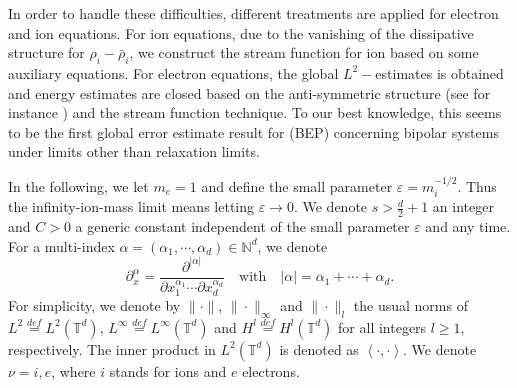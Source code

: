 \documentclass[reqno,twoside,12pt,a4paper]{amsart}
\newcommand{\T}{\mathbb{T}}
\newcommand{\eps}{\mathbb{\varepsilon}}
\newcommand{\pa}{\partial}
\numberwithin{equation}{section}
\begin{document}
In order to handle these difficulties, different treatments are applied for electron and ion equations. For ion equations,  due to the vanishing of the dissipative structure for $\rho_i-\bar{\rho}_i$, we construct the stream function for ion based on some auxiliary equations. For electron equations,  the global $L^2-$estimates is obtained and energy estimates are closed based on the anti-symmetric structure (see for instance \cite{Guo2011,Peng2015a}) and the stream function technique. To our best knowledge, this seems to be the first global error estimate result for (BEP) concerning bipolar systems under limits other than relaxation limits.

In the following, we let $m_e=1$ and define the small parameter $\eps=m_i^{-1/2}$. Thus the infinity-ion-mass limit means letting $\eps\rightarrow 0$. We denote $s>\frac{d}{2}+1$ an integer and $ C>0$  a generic constant independent of the small parameter $ \eps $ and any time.  For a multi-index $\alpha=(\alpha_1,\cdots,\alpha_d)\in\mathbb{N}^d$,
we denote
\[  \pa_x^\alpha=\dfrac{\pa^{|\alpha|}}{\pa x_1^{\alpha_1}\cdots\pa x_d^{\alpha_d}}
\quad {\text {with}} \quad |\alpha|=\alpha_1+\cdots+\alpha_d.  \]
For simplicity, we denote by $\|\cdot\|$, $\|\cdot\|_\infty$ and $\|\cdot\|_l$
the usual norms of $L^2\stackrel{def}{=}L^2(\T^d)$,
$L^\infty\stackrel{def}{=}L^\infty(\T^d)$ and $H^l\stackrel{def}{=}H^l(\T^d)$
for all integers $l\ge 1$, respectively. The inner product in $L^2(\T^d)$ is denoted as $\left<\cdot, \cdot\right>$. We denote $\nu=i,e$, where $i$ stands for ions and $e$ electrons. 
\end{document}
